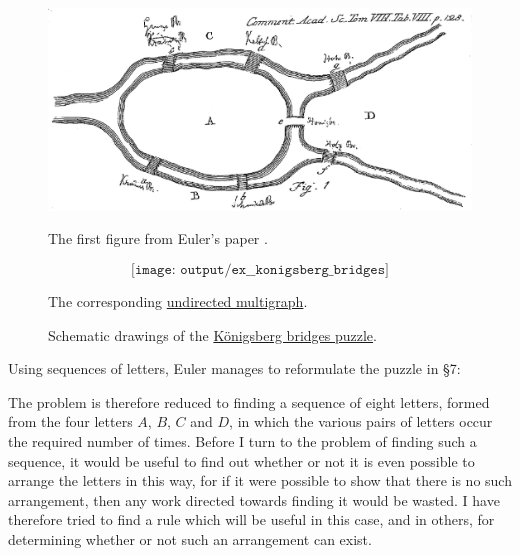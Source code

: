\begin{example}
  \begin{figure}[ht!]
    \begin{subcaptionblock}{0.55\textwidth}
      \centering
      \includegraphics[width=\textwidth]{images/ex__konigsberg_bridges__schematic__drawing}
      \caption{The first figure from Euler's paper \cite{Euler1741}.}
      \label{fig:ex:konigsberg_bridges/schematic/drawing}
    \end{subcaptionblock}
    \hfill
    \begin{subcaptionblock}{0.4\textwidth}
      \centering
      \begin{equation}\label{eq:fig:ex:konigsberg_bridges/schematic/graph}
        \texttt{[image: output/ex\_\_konigsberg\_bridges]}
      \end{equation}
      \caption{The corresponding \hyperref[def:undirected_multigraph]{undirected multigraph}.}
      \label{fig:ex:konigsberg_bridges/schematic/graph}
    \end{subcaptionblock}

    \caption{Schematic drawings of the \hyperref[ex:konigsberg_bridges]{K\"onigsberg bridges puzzle}.}\label{fig:ex:konigsberg_bridges/schematic}
  \end{figure}

  Using sequences of letters, Euler manages to reformulate the puzzle in \S 7:
  \begin{displayquote}
    The problem is therefore reduced to finding a sequence of eight letters, formed from the four letters \( A \), \( B \), \( C \) and \( D \), in which the various pairs of letters occur the required number of times. Before I turn to the problem of finding such a sequence, it would be useful to find out whether or not it is even possible to arrange the letters in this way, for if it were possible to show that there is no such arrangement, then any work directed towards finding it would be wasted. I have therefore tried to find a rule which will be useful in this case, and in others, for determining whether or not such an arrangement can exist.
  \end{displayquote}


\end{example}
